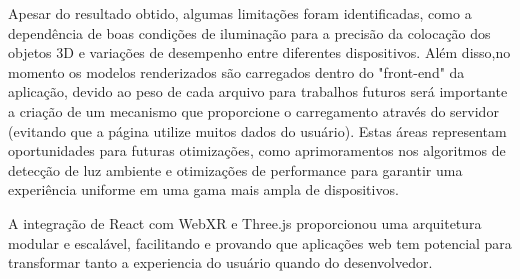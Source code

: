 \documentclass[conference]{IEEEtran}
\begin{document}
\par Apesar do resultado obtido, algumas limitações foram identificadas, como a
dependência de boas condições de iluminação para a precisão da colocação dos
objetos 3D e variações de desempenho entre diferentes dispositivos. Além
disso,no momento os modelos renderizados são carregados dentro do "front-end"
da aplicação, devido ao peso de cada arquivo para trabalhos futuros será
importante a criação de um mecanismo que proporcione o carregamento através do
servidor (evitando que a página utilize muitos dados do usuário). Estas áreas
representam oportunidades para futuras otimizações, como aprimoramentos nos
algoritmos de detecção de luz ambiente e otimizações de performance para
garantir uma experiência uniforme em uma gama mais ampla de dispositivos.

\par A integração de React com WebXR e Three.js proporcionou uma arquitetura modular
e escalável, facilitando e provando que aplicações web tem potencial para
transformar tanto a experiencia do usuário quando do desenvolvedor.
\end{document}
